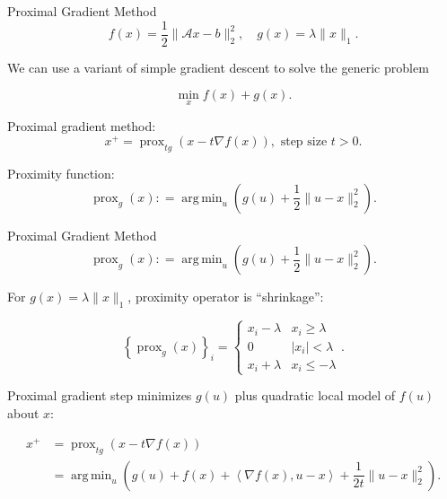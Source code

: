 \documentclass[xcolor=dvipsnames,t]{beamer} %
\newcommand{\defeq}{\mathrel{\mathop:}=}
\DeclareMathOperator*{\argmin}{arg\,min}
\begin{document}

\begin{frame}{Proximal Gradient Method}
   \[ f(x) = \dfrac{1}{2}\|\mathcal{A}x-b\|_2^2, \quad g(x) = \lambda \|x\|_1. \] 

   We can use a variant of simple gradient descent to solve the generic problem

   \[ \min_x f(x) + g(x). \] 

   Proximal gradient method:
   \[ x^{+} = \operatorname{prox}_{t g}\left(x - t\nabla f(x)\right), \text{ step size $t>0$}. \] 
   
   Proximity function: 
   \[ \operatorname{prox}_g(x) \defeq \argmin_u\left(g(u) + \dfrac{1}{2}\|u-x\|_2^2\right). \] 

\end{frame}

\begin{frame}{Proximal Gradient Method}
   \[ \operatorname{prox}_g(x) \defeq \argmin_u\left(g(u) + \dfrac{1}{2}\|u-x\|_2^2\right). \] 

   For $g(x) = \lambda\|x\|_1$, proximity operator is ``shrinkage'':

   \[ \left\{\operatorname{prox}_g(x)\right\}_i = \left\{\begin{array}{ll} x_i-\lambda & x_i \ge \lambda\\0 & |x_i| < \lambda\\ x_i + \lambda & x_i\le -\lambda\end{array}\right.. \] 

   Proximal gradient step minimizes $g(u)$ plus quadratic local model of $f(u)$ about $x$:

   \begin{align*}
      x^+ &= \operatorname{prox}_{t g}\left(x - t\nabla f(x)\right)\\
              &= \argmin_u\left(g(u) + f(x) + \left\langle \nabla f(x), u-x\right\rangle + \dfrac{1}{2t}\|u-x\|_2^2\right).
   \end{align*}

\end{frame}
\end{document}
